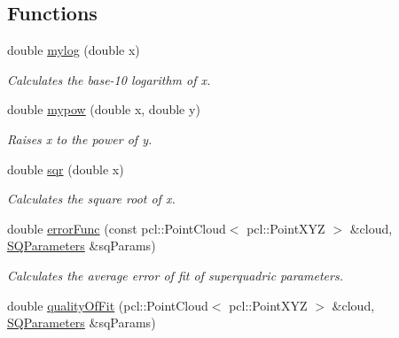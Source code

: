 \subsection*{Functions}
\begin{DoxyCompactItemize}
\item 
\hypertarget{namespaceope_a3168ecd2c0e76a877247c1dc042fc29a}{double \hyperlink{namespaceope_a3168ecd2c0e76a877247c1dc042fc29a}{mylog} (double x)}\label{namespaceope_a3168ecd2c0e76a877247c1dc042fc29a}

\begin{DoxyCompactList}\small\item\em Calculates the base-\/10 logarithm of x. \end{DoxyCompactList}\item 
\hypertarget{namespaceope_af362a9d70a7e98149b5ac0c08d7cac9e}{double \hyperlink{namespaceope_af362a9d70a7e98149b5ac0c08d7cac9e}{mypow} (double x, double y)}\label{namespaceope_af362a9d70a7e98149b5ac0c08d7cac9e}

\begin{DoxyCompactList}\small\item\em Raises x to the power of y. \end{DoxyCompactList}\item 
\hypertarget{namespaceope_a8b7caa55d22fca92daa7da774f6a6145}{double \hyperlink{namespaceope_a8b7caa55d22fca92daa7da774f6a6145}{sqr} (double x)}\label{namespaceope_a8b7caa55d22fca92daa7da774f6a6145}

\begin{DoxyCompactList}\small\item\em Calculates the square root of x. \end{DoxyCompactList}\item 
double \hyperlink{namespaceope_a3f02990e29d089b0653c18c5c3ef50a2}{error\-Func} (const pcl\-::\-Point\-Cloud$<$ pcl\-::\-Point\-X\-Y\-Z $>$ \&cloud, \hyperlink{classope_1_1_s_q_parameters}{S\-Q\-Parameters} \&sq\-Params)
\begin{DoxyCompactList}\small\item\em Calculates the average error of fit of superquadric parameters. \end{DoxyCompactList}\item 
\hypertarget{namespaceope_a9f066f6bda7434d4c15b56b774c627fc}{double \hyperlink{namespaceope_a9f066f6bda7434d4c15b56b774c627fc}{quality\-Of\-Fit} (pcl\-::\-Point\-Cloud$<$ pcl\-::\-Point\-X\-Y\-Z $>$ \&cloud, \hyperlink{classope_1_1_s_q_parameters}{S\-Q\-Parameters} \&sq\-Params)}\label{namespaceope_a9f066f6bda7434d4c15b56b774c627fc}


\end{DoxyCompactItemize}

